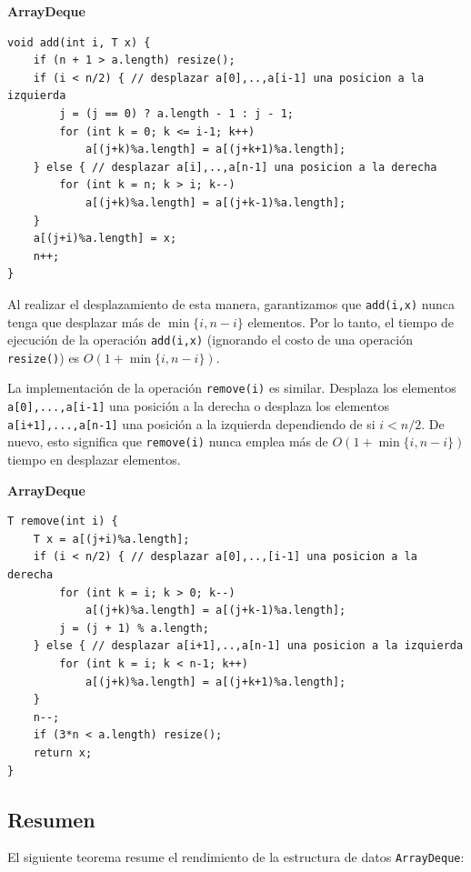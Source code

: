 \documentclass[11pt]{book}
\theoremstyle{plain}
\newcommand{\claseheader}[1]{\noindent\textbf{#1}\par\vspace{-4pt}}
\begin{document}
\claseheader{ArrayDeque}
\begin{lstlisting}
void add(int i, T x) {
    if (n + 1 > a.length) resize();
    if (i < n/2) { // desplazar a[0],..,a[i-1] una posicion a la izquierda
        j = (j == 0) ? a.length - 1 : j - 1;
        for (int k = 0; k <= i-1; k++)
            a[(j+k)%a.length] = a[(j+k+1)%a.length];
    } else { // desplazar a[i],..,a[n-1] una posicion a la derecha
        for (int k = n; k > i; k--)
            a[(j+k)%a.length] = a[(j+k-1)%a.length];
    }
    a[(j+i)%a.length] = x;
    n++;
}
\end{lstlisting}

Al realizar el desplazamiento de esta manera, garantizamos que \texttt{add(i,x)} nunca tenga que desplazar más de $\min\{i, n-i\}$ elementos. Por lo tanto, el tiempo de ejecución de la operación \texttt{add(i,x)} (ignorando el costo de una operación \texttt{resize()}) es $O(1 + \min\{i, n-i\})$.

La implementación de la operación \texttt{remove(i)} es similar. Desplaza los elementos \texttt{a[0],...,a[i-1]} una posición a la derecha o desplaza los elementos \texttt{a[i+1],...,a[n-1]} una posición a la izquierda dependiendo de si $i < n/2$. De nuevo, esto significa que \texttt{remove(i)} nunca emplea más de $O(1 + \min\{i, n-i\})$ tiempo en desplazar elementos.

\claseheader{ArrayDeque}
\begin{lstlisting}
T remove(int i) {
    T x = a[(j+i)%a.length];
    if (i < n/2) { // desplazar a[0],..,[i-1] una posicion a la derecha
        for (int k = i; k > 0; k--)
            a[(j+k)%a.length] = a[(j+k-1)%a.length];
        j = (j + 1) % a.length;
    } else { // desplazar a[i+1],..,a[n-1] una posicion a la izquierda
        for (int k = i; k < n-1; k++)
            a[(j+k)%a.length] = a[(j+k+1)%a.length];
    }
    n--;
    if (3*n < a.length) resize();
    return x;
}
\end{lstlisting}

\subsection{Resumen}

El siguiente teorema resume el rendimiento de la estructura de datos \texttt{ArrayDeque}:
\end{document}
